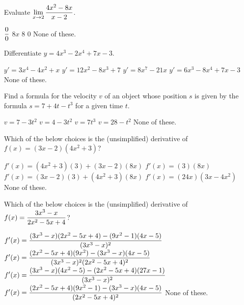 \documentclass[12pt]{exam}
\newcommand{\ds}{\ensuremath{\displaystyle}}
\newcommand{\<}{\langle}
\renewcommand{\>}{\rangle}
\begin{document}
\begin{questions}

\setcounter{question}{0}

\question[20]
Evaluate \(\ds\lim_{x\to 2}\frac{4x^2-8x}{x-2}\).

\begin{checkboxes}
  \choice \(\ds\frac{0}{0}\)
  \choice \(8x\)
  \choice \(8\)
  \choice \(0\)
  \choice None of these.
\end{checkboxes}

\vfill

\question[20]
Differentiate \(y=4x^3-2x^4+7x-3\).

\begin{checkboxes}
  \choice \(y'=3x^4-4x^2+x\)
  \choice \(y'=12x^2-8x^3+7\)
  \choice \(y'=8x^7-21x\)
  \choice \(y'=6x^3-8x^4+7x-3\)
  \choice None of these.
\end{checkboxes}

\vfill

\question[20]
Find a formula for the velocity \(v\) of an object whose position \(s\) is
given by the formula \(s=7+4t-t^3\) for a given time \(t\).

\begin{checkboxes}
  \choice \(v=7-3t^2\)
  \choice \(v=4-3t^2\)
  \choice \(v=7t^3\)
  \choice \(v=28-t^2\)
  \choice None of these.
\end{checkboxes}

\vfill
\newpage

\question[20]
Which of the below choices is the (unsimplified) derivative of\\
\(f(x)=(3x-2)(4x^2+3)\)?

\begin{checkboxes}
  \choice \(f'(x)=(4x^2+3)(3)+(3x-2)(8x)\)
  \choice \(f'(x)=(3)(8x)\)
  \choice \(f'(x)=(3x-2)(3)+(4x^2+3)(8x)\)
  \choice \(f'(x)=(24x)(3x-4x^2)\)
  \choice None of these.
\end{checkboxes}

\vfill

\question[20]
Which of the below choices is the (unsimplified) derivative of\\
\(\ds f(x)=\frac{3x^3-x}{2x^2-5x+4}\)?

\begin{checkboxes}
  \choice \(\ds f'(x)=\frac{(3x^3-x)(2x^2-5x+4)-(9x^2-1)(4x-5)}{(3x^3-x)^2}\)
  \choice \(\ds f'(x)=\frac{(2x^2-5x+4)(9x^2)-(3x^3-x)(4x-5)}{(3x^3-x)^2(2x^2-5x+4)^2}\)
  \choice \(\ds f'(x)=\frac{(3x^3-x)(4x^2-5)-(2x^2-5x+4)(27x-1)}{(3x^3-x)^2}\)
  \choice \(\ds f'(x)=\frac{(2x^2-5x+4)(9x^2-1)-(3x^3-x)(4x-5)}{(2x^2-5x+4)^2}\)
  \choice None of these.
\end{checkboxes}


\end{questions}
\end{document}
